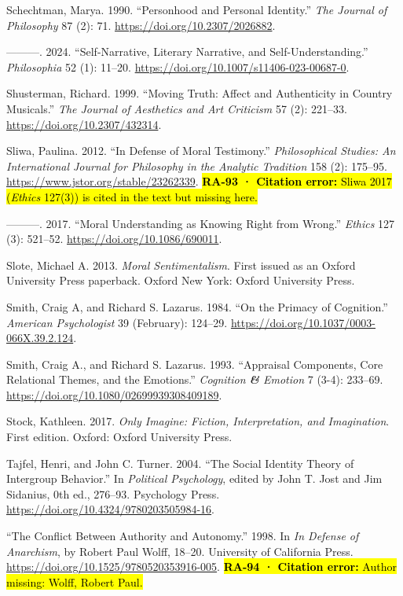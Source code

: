 \documentclass[
  letterpaper,
  DIV=11,
  numbers=noendperiod]{scrartcl}
\theoremstyle{remark}
\begin{document}
Schechtman, Marya. 1990. ``Personhood and Personal Identity.'' \emph{The
Journal of Philosophy} 87 (2): 71.
\url{https://doi.org/10.2307/2026882}.

---------. 2024. ``Self-Narrative, Literary Narrative, and
Self-Understanding.'' \emph{Philosophia} 52 (1): 11--20.
\url{https://doi.org/10.1007/s11406-023-00687-0}.

Shusterman, Richard. 1999. ``Moving Truth: Affect and Authenticity in
Country Musicals.'' \emph{The Journal of Aesthetics and Art Criticism}
57 (2): 221--33. \url{https://doi.org/10.2307/432314}.

Sliwa, Paulina. 2012. ``In Defense of Moral Testimony.''
\emph{Philosophical Studies: An International Journal for Philosophy in
the Analytic Tradition} 158 (2): 175--95.
\url{https://www.jstor.org/stable/23262339}. \hl{\textbf{RA-93 ·
Citation error:} Sliwa 2017 (\emph{Ethics} 127(3)) is cited in the text
but missing here.}

---------. 2017. ``Moral Understanding as Knowing Right from Wrong.''
\emph{Ethics} 127 (3): 521--52. \url{https://doi.org/10.1086/690011}.

Slote, Michael A. 2013. \emph{Moral Sentimentalism}. First issued as an
Oxford University Press paperback. Oxford New York: Oxford University
Press.

Smith, Craig A, and Richard S. Lazarus. 1984. ``On the Primacy of
Cognition.'' \emph{American Psychologist} 39 (February): 124--29.
\url{https://doi.org/10.1037/0003-066X.39.2.124}.

Smith, Craig A., and Richard S. Lazarus. 1993. ``Appraisal Components,
Core Relational Themes, and the Emotions.'' \emph{Cognition \textbf{\&}
Emotion} 7 (3-4): 233--69.
\url{https://doi.org/10.1080/02699939308409189}.

Stock, Kathleen. 2017. \emph{Only Imagine: Fiction, Interpretation, and
Imagination}. First edition. Oxford: Oxford University Press.

Tajfel, Henri, and John C. Turner. 2004. ``The Social Identity Theory of
Intergroup Behavior.'' In \emph{Political Psychology}, edited by John T.
Jost and Jim Sidanius, 0th ed., 276--93. Psychology Press.
\url{https://doi.org/10.4324/9780203505984-16}.

``The Conflict Between Authority and Autonomy.'' 1998. In \emph{In
Defense of Anarchism}, by Robert Paul Wolff, 18--20. University of
California Press. \url{https://doi.org/10.1525/9780520353916-005}.
\hl{\textbf{RA-94 · Citation error:} Author missing: Wolff, Robert
Paul.}
\end{document}
